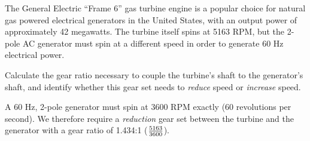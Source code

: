 

The General Electric ``Frame 6'' gas turbine engine is a popular choice for natural gas powered electrical generators in the United States, with an output power of approximately 42 megawatts.  The turbine itself spins at 5163 RPM, but the 2-pole AC generator must spin at a different speed in order to generate 60 Hz electrical power.

\vskip 10pt

Calculate the gear ratio necessary to couple the turbine's shaft to the generator's shaft, and identify whether this gear set needs to {\it reduce} speed or {\it increase} speed.








A 60 Hz, 2-pole generator must spin at 3600 RPM exactly (60 revolutions per second).  We therefore require a {\it reduction} gear set between the turbine and the generator with a gear ratio of 1.434:1 ($5163 \over 3600$).











